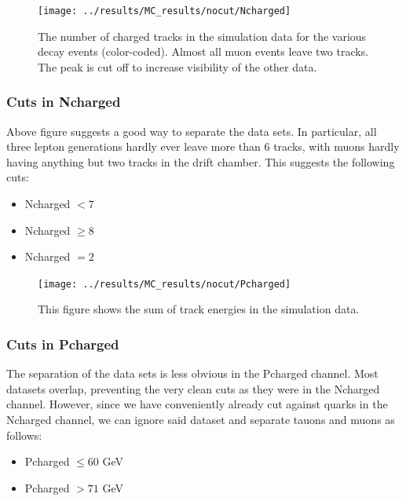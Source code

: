 \newpage
\begin{figure}[H]
\centering
\texttt{[image: ../results/MC\_results/nocut/Ncharged]}
\caption[Ncharged in simulation data]{The number of charged tracks in the simulation data for the various decay events (color-coded). Almost all muon events leave two tracks. The peak is cut off to increase visibility of the other data.}
\label{fig:Ncharged}
\end{figure}

\subsubsection{Cuts in Ncharged}
Above figure suggests a good way to separate the data sets. In particular, all three lepton generations hardly ever leave more than 6 tracks, with muons hardly having anything but two tracks in the drift chamber. This suggests the following cuts:

\begin{itemize}
	\item{ Ncharged $<7$}
	\item{ Ncharged $\ge8$}
	\item{ Ncharged $=2$}
\end{itemize}



\newpage
\begin{figure}[H]
\centering
\texttt{[image: ../results/MC\_results/nocut/Pcharged]}
\caption[Pcharged in simulation data]{This figure shows the sum of track energies in the simulation data. }
\label{fig:Pcharged}
\end{figure}

\subsubsection{Cuts in Pcharged}
The separation of the data sets is less obvious in the Pcharged channel. Most datasets overlap, preventing the very clean cuts as they were in the Ncharged channel. However, since we have conveniently already cut against quarks in the Ncharged channel, we can ignore said dataset and separate tauons and muons as follows:
\begin{itemize}
	\item{ Pcharged $\le60$ GeV}
	\item{ Pcharged $>71$ GeV}
\end{itemize}

